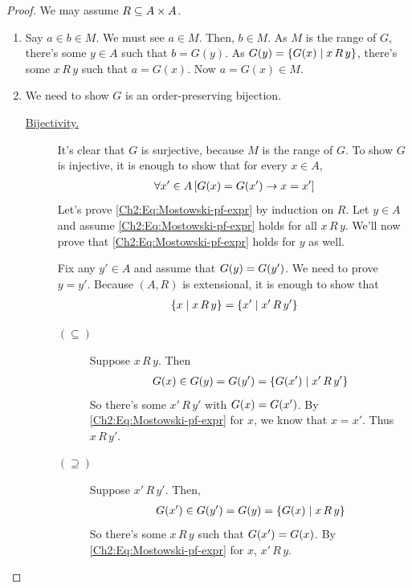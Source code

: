\begin{proof}
    We may assume $R \subseteq A \times A$.

    \begin{enumerate}
        \item Say $a \in b \in M$. We must see $a \in M$. Then, $b \in M$. As $M$ is the range of $G$, there's some $y \in  A$ such that $b = G(y)$. As $G(y) = \left\{ G(x) \; \middle\vert \; x \, R \, y \right\}$, there's some $x \, R \, y$ such that $a = G(x)$. Now $a = G(x) \in M$.

        \item We need to show $G$ is an order-preserving bijection.
        
        \begin{description}
            \item[\underline{Bijectivity.}] It's clear that $G$ is surjective, because $M$ is the range of $G$. To show $G$ is injective, it is enough to show that for every $x \in  A$,
            \begin{align}
                \forall x' \in A \left[ G(x) = G\!\left( x' \right) \to x = x' \right]
                \label{Ch2:Eq:Mostowski-pf-expr}
            \end{align}
            Let's prove \eqref{Ch2:Eq:Mostowski-pf-expr} by induction on $R$. Let $y \in A$ and assume \eqref{Ch2:Eq:Mostowski-pf-expr} holds for all $x \, R \, y$. We'll now prove that \eqref{Ch2:Eq:Mostowski-pf-expr} holds for $y$ as well.
    
            Fix any $y' \in A$ and assume that $G(y) = G\!\left( y' \right)$. We need to prove $y = y'$. Because $(A, R)$ is extensional, it is enough to show that
            \begin{align*}
                \left\{ x \; \middle\vert \; x \, R \, y \right\} = \left\{ x' \; \middle\vert \; x' \, R \, y' \right\}
            \end{align*}
            \begin{description}
                \item[$(\subseteq)$]
                    Suppose $x \, R \, y$. Then
                    \begin{align*}
                        G(x) \in G(y) = G\!\left( y' \right) = \left\{ G\!\left( x' \right) \; \middle\vert \; x' \, R \, y' \right\}
                    \end{align*}
                    So there's some $x' \, R \, y'$ with $G(x) = G\!\left( x' \right)$. By \eqref{Ch2:Eq:Mostowski-pf-expr} for $x$, we know that $x = x'$. Thus $x \, R \, y'$.
    
                \item[$(\supseteq)$]
                    Suppose $x' \, R \, y'$. Then,
                    \begin{align*}
                        G\!\left( x' \right) \in G\!\left( y' \right) = G(y) = \left\{ G(x) \; \middle\vert \; x \, R \, y \right\}
                    \end{align*}
                    So there's some $x \, R \, y$ such that $G\!\left( x' \right) = G(x)$. By \eqref{Ch2:Eq:Mostowski-pf-expr} for $x$, $x' \, R \, y$.
            \end{description}


\end{description}
\end{enumerate}
\end{proof}
